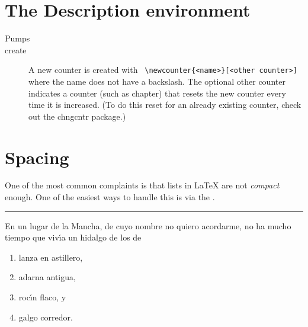 \section{The Description environment}
\renewcommand\descriptionlabel[1]%
{\hspace{\labelsep}\textsf{#1}}
\begin{description}
\item[] \lorem
\item[] \lorem
\item[Pumps]  \dogs
\item[create] A new counter is created with
\verb+ \newcounter{<name>}[<other counter>]+
where the name does not have a backslash. The optional other counter indicates
a counter (such as chapter) that resets the new counter every time it is increased.
(To do this reset for an already existing counter, check out the chngcntr
package.)
\end{description}

\section{Spacing}

\normalsize

One of the most common complaints is that lists in LaTeX are not \textit{compact} enough. One of the easiest ways to handle this is via the .


\hrule

\begin{teXXX}
En un lugar de la Mancha, de cuyo nombre no quiero acordarme,
no ha mucho tiempo que viv\'{\i}a un hidalgo de los de

\begin{enumerate}[labelindent=\parindent,leftmargin=*]
\item lanza en astillero,
\item adarna antigua,
\item roc\'{\i}n flaco, y
\item galgo corredor.
\end{enumerate}
\end{teXXX}

